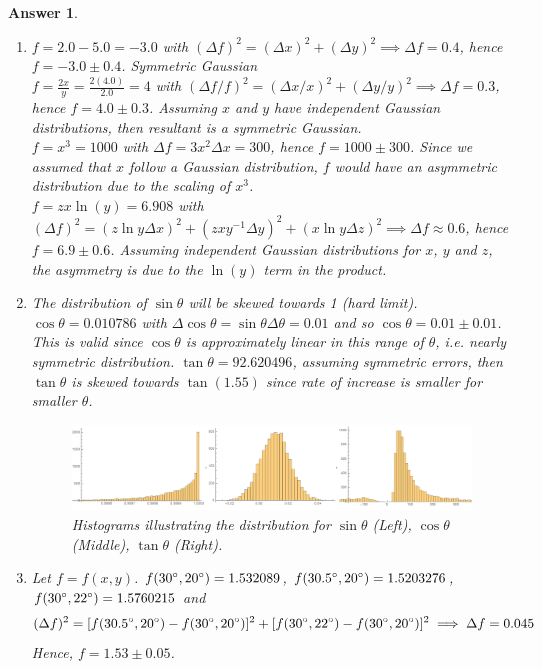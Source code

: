 \documentclass[a4paper]{article}
\newtheorem{ans}{Answer}[section]
\theoremstyle{new}
\begin{document}
\begin{ans}\leavevmode
\begin{enumerate}[label=(\alph*)]
\item $f=2.0-5.0=-3.0$ with $(\Delta f)^2=(\Delta x)^2+(\Delta y)^2\implies\Delta f=0.4$, hence $f=-3.0\pm0.4$. Symmetric Gaussian\\[5pt]
$f=\frac{2x}{y}=\frac{2(4.0)}{2.0}=4$ with $(\Delta f/f)^2=(\Delta x/x)^2+(\Delta y/y)^2\implies\Delta f=0.3$, hence $f=4.0\pm0.3$. Assuming $x$ and $y$ have independent Gaussian distributions, then resultant is a symmetric Gaussian.\\[5pt]
$f=x^3=1000$ with $\Delta f=3x^2\Delta x=300$, hence $f=1000\pm300$. Since we assumed that $x$ follow a Gaussian distribution, $f$ would have an asymmetric distribution due to the scaling of $x^3$.\\[5pt]
$f=zx\ln(y)=6.908$ with $(\Delta f)^2=(z\ln y \Delta x)^2+(zxy^{-1}\Delta y)^2+(x\ln y\Delta z)^2\implies\Delta f\approx 0.6$, hence $f=6.9\pm0.6$. Assuming independent Gaussian distributions for $x$, $y$ and $z$, the asymmetry is due to the $\ln(y)$ term in the product.
\item The distribution of $\sin\theta$ will be skewed towards 1 (hard limit). $\cos\theta=0.010786$ with $\Delta\cos\theta=\sin\theta\Delta\theta=0.01$ and so $\cos\theta=0.01\pm0.01$. This is valid since $\cos\theta$ is approximately linear in this range of $\theta$, i.e. nearly symmetric distribution. $\tan\theta=92.620496$, assuming symmetric errors, then $\tan\theta$ is skewed towards $\tan(1.55)$ since rate of increase is smaller for smaller $\theta$.
\begin{figure}[H]
    \centering
    \includegraphics[width=\linewidth]{1_7.PNG}
    \caption{Histograms illustrating the distribution for $\sin\theta$ (Left), $\cos\theta$ (Middle), $\tan\theta$ (Right).}
\end{figure}
\item Let $f=f(x,y)$. $f(30\degree,20\degree)=1.532089$, $f(30.5\degree,20\degree)=1.5203276$, $f(30\degree,22\degree)=1.5760215$ and
$$(\Delta f)^2=[f(30.5\degree,20\degree)-f(30\degree,20\degree)]^2+[f(30\degree,22\degree)-f(30\degree,20\degree)]^2\implies\Delta f=0.045$$
Hence, $f=1.53\pm0.05$.
\end{enumerate}
\end{ans}
\newpage
\end{document}
